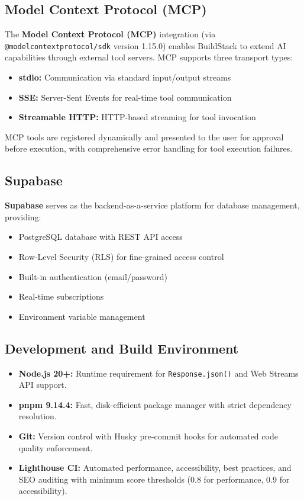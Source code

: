 \documentclass[12pt,a4paper,openany]{report}
\begin{document}
\subsection{Model Context Protocol (MCP)}
The \textbf{Model Context Protocol (MCP)} integration (via \texttt{@modelcontextprotocol/sdk} version 1.15.0) enables BuildStack to extend AI capabilities through external tool servers. MCP supports three transport types:
\begin{itemize}
    \item \textbf{stdio:} Communication via standard input/output streams
    \item \textbf{SSE:} Server-Sent Events for real-time tool communication
    \item \textbf{Streamable HTTP:} HTTP-based streaming for tool invocation
\end{itemize}

MCP tools are registered dynamically and presented to the user for approval before execution, with comprehensive error handling for tool execution failures.

\subsection{Supabase}
\textbf{Supabase} serves as the backend-as-a-service platform for database management, providing:
\begin{itemize}
    \item PostgreSQL database with REST API access
    \item Row-Level Security (RLS) for fine-grained access control
    \item Built-in authentication (email/password)
    \item Real-time subscriptions
    \item Environment variable management
\end{itemize}

\subsection{Development and Build Environment}
\begin{itemize}
    \item \textbf{Node.js 20+:} Runtime requirement for \texttt{Response.json()} and Web Streams API support.
    \item \textbf{pnpm 9.14.4:} Fast, disk-efficient package manager with strict dependency resolution.
    \item \textbf{Git:} Version control with Husky pre-commit hooks for automated code quality enforcement.
    \item \textbf{Lighthouse CI:} Automated performance, accessibility, best practices, and SEO auditing with minimum score thresholds (0.8 for performance, 0.9 for accessibility).
\end{itemize}
\end{document}
